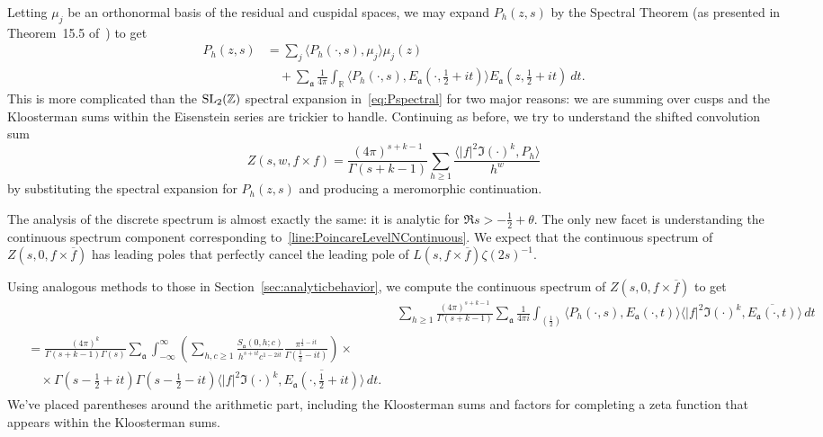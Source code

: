 Letting $\mu_j$ be an orthonormal basis of the residual and cuspidal spaces, we may expand
$P_h(z,s)$ by the Spectral Theorem (as presented in Theorem~15.5
of~\cite{IwaniecKowalski04}) to get
\begin{align}
  P_h(z,s) &= \sum_j \langle P_h(\cdot, s), \mu_j \rangle \mu_j(z) \\
           &\quad + \sum_\mathfrak{a} \frac{1}{4\pi} \int_\mathbb{R} \langle P_h(\cdot,
           s), E_\mathfrak{a}(\cdot, \tfrac{1}{2} + it)\rangle E_\mathfrak{a}(z,
           \tfrac{1}{2} + it) \ dt. \label{line:PoincareLevelNContinuous}
\end{align}
This is more complicated than the $\operatorname{SL}_2(\mathbb{Z})$ spectral expansion
in~\eqref{eq:Pspectral} for two major reasons: we are summing over cusps and the
Kloosterman sums within the Eisenstein series are trickier to handle.
Continuing as before, we try to understand the shifted convolution sum
\begin{equation}
  Z(s,w,f\times f) = \frac{(4\pi)^{s + k - 1}}{\Gamma(s + k - 1)}\sum_{h \geq
  1}\frac{\langle \lvert f \rvert^2 \Im(\cdot)^k, P_h\rangle}{h^w}
\end{equation}
by substituting the spectral expansion for $P_h(z,s)$ and producing a meromorphic
continuation.



The analysis of the discrete spectrum is almost exactly the same: it is analytic for $\Re
s > -\frac{1}{2} + \theta$.
The only new facet is understanding the continuous spectrum component corresponding
to~\eqref{line:PoincareLevelNContinuous}.
We expect that the continuous spectrum of $Z(s, 0, f\times \overline{f})$ has leading
poles that perfectly cancel the leading pole of $L(s, f\times \overline{f})
\zeta(2s)^{-1}$.

Using analogous methods to those in Section~\ref{sec:analyticbehavior}, we compute the
continuous spectrum of $Z(s, 0, f\times \overline{f})$ to get
\begin{align}
  &\sum_{h \geq 1}\frac{(4\pi)^{s + k - 1}}{\Gamma(s + k - 1)}\sum_{\mathfrak{a}}
  \frac{1}{4\pi i} \int_{(\frac{1}{2})} \langle P_h(\cdot, s), E_\mathfrak{a}(\cdot,
  t)\rangle \langle \lvert f \rvert^2 \Im(\cdot)^k, \overline{E_\mathfrak{a}(\cdot,
  t)}\rangle \, dt \nonumber \\
  \begin{split}
  & = \frac{(4\pi)^k}{\Gamma(s + k - 1)\Gamma(s)}\sum_{\mathfrak{a}} \int_{-\infty}^\infty
    \left( \sum_{h,c \geq 1} \frac{S_\mathfrak{a} (0, h; c)}{h^{s + it} c^{1 -
    2it}}\frac{\pi^{\frac{1}{2} - it}}{\Gamma(\frac{1}{2} - it)}\right) \times \\
  &\quad \times \Gamma(s - \tfrac{1}{2} + it)\Gamma(s - \tfrac{1}{2} - it) \langle \lvert
    f \rvert^2 \Im(\cdot)^k, \overline{E_\mathfrak{a}(\cdot, \tfrac{1}{2} + it)} \rangle \,
    dt.
  \end{split}
\end{align}
We've placed parentheses around the arithmetic part, including the Kloosterman sums and
factors for completing a zeta function that appears within the Kloosterman sums.


